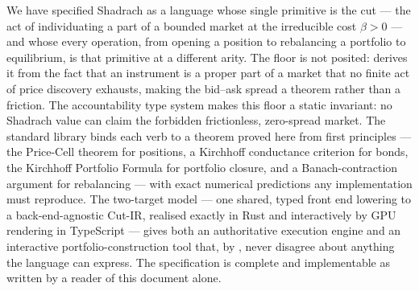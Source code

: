 \documentclass[11pt,a4paper]{article}
\theoremstyle{thmstyle}
\theoremstyle{definition}
\theoremstyle{remark}
\newcommand{\flo}{\beta}
\begin{document}
We have specified Shadrach as a language whose single primitive is the
cut --- the act of individuating a part of a bounded market at the
irreducible cost $\flo>0$ --- and whose every operation, from opening a
position to rebalancing a portfolio to equilibrium, is that primitive at
a different arity. The floor is not posited:  derives
it from the fact that an instrument is a proper part of a market that no
finite act of price discovery exhausts, making the bid--ask spread a
theorem rather than a friction. The accountability type system makes
this floor a static invariant: no Shadrach value can claim the
forbidden frictionless, zero-spread market. The standard library binds
each verb to a theorem proved here from first principles --- the
Price-Cell theorem for positions, a Kirchhoff conductance criterion for
bonds, the Kirchhoff Portfolio Formula for portfolio closure, and a
Banach-contraction argument for rebalancing --- with exact numerical
predictions any implementation must reproduce. The two-target model ---
one shared, typed front end lowering to a back-end-agnostic Cut-IR,
realised exactly in Rust and interactively by GPU rendering in
TypeScript --- gives both an authoritative execution engine and an
interactive portfolio-construction tool that, by
, never disagree about anything the language can
express. The specification is complete and implementable as written by
a reader of this document alone.



\end{document}
